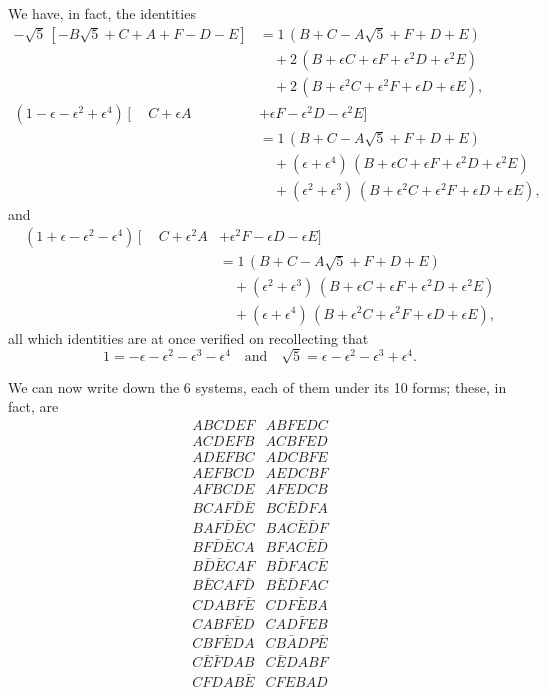 \documentclass[11pt]{article}
\begin{document}
\noindent We have, in fact, the identities
\begin{align*}
-\sqrt{5}\,[-B\sqrt{5} + C + A + F - D - E] &= 1\,(B + C - A\sqrt{5} + F + D + E) \\
&\quad + 2\,(B + \epsilon C + \epsilon F + \epsilon^{2}D + \epsilon^{2}E) \\
&\quad + 2\,(B + \epsilon^{2}C + \epsilon^{2}F + \epsilon D + \epsilon E), \\[4pt]
(1 - \epsilon - \epsilon^{2} + \epsilon^{4})\,[\phantom{-}C + \epsilon A &+ \epsilon F - \epsilon^{2}D - \epsilon^{2}E] \\
&= 1\,(B + C - A\sqrt{5} + F + D + E) \\
&\quad + (\epsilon + \epsilon^{4})\,(B + \epsilon C + \epsilon F + \epsilon^{2}D + \epsilon^{2}E) \\
&\quad + (\epsilon^{2} + \epsilon^{3})\,(B + \epsilon^{2}C + \epsilon^{2}F + \epsilon D + \epsilon E),
\end{align*}
and
\begin{align*}
(1 + \epsilon - \epsilon^{2} - \epsilon^{4})\,[\phantom{-}C + \epsilon^{2}A &+ \epsilon^{2}F - \epsilon D - \epsilon E] \\
&= 1\,(B + C - A\sqrt{5} + F + D + E) \\
&\quad + (\epsilon^{2} + \epsilon^{3})\,(B + \epsilon C + \epsilon F + \epsilon^{2}D + \epsilon^{2}E) \\
&\quad + (\epsilon + \epsilon^{4})\,(B + \epsilon^{2}C + \epsilon^{2}F + \epsilon D + \epsilon E),
\end{align*}
all which identities are at once verified on recollecting that
\[
1 = -\epsilon - \epsilon^{2} - \epsilon^{3} - \epsilon^{4}\quad \text{and}\quad \sqrt{5} = \epsilon - \epsilon^{2} - \epsilon^{3} + \epsilon^{4}.
\]

We can now write down the 6 systems, each of them under its 10 forms; these, in fact, are
\[
\begin{array}{l|l}
ABCDEF & ABFEDC \\
ACDEFB & ACBFED \\
ADEFBC & ADCBFE \\
AEFBCD & AEDCBF \\
AFBCDE & AFEDCB \\
\hline
BCAF\bar{D}\bar{E} & BC\bar{E}\bar{D}FA \\
BAF\bar{D}\bar{E}C & BAC\bar{E}\bar{D}F \\
BF\bar{D}\bar{E}CA & BFAC\bar{E}\bar{D} \\
B\bar{D}\bar{E}CAF & B\bar{D}FAC\bar{E} \\
B\bar{E}CAF\bar{D} & B\bar{E}\bar{D}FAC \\
\hline
CDABF\bar{E} & CDF\bar{E}BA \\
CABF\bar{E}D & CAD\bar{F}EB \\
CBF\bar{E}DA & CB\bar{A}DP\bar{E} \\
C\bar{E}\bar{F}DAB & C\bar{E}DABF \\
CFDAB\bar{E} & CFEBAD \\
\end{array}
\]
\end{document}
